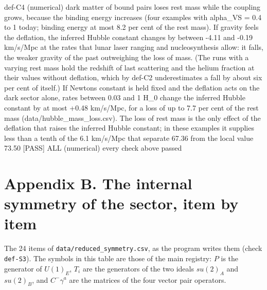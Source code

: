 \documentclass[
  10pt,
]{article}
\newenvironment{Shaded}{}{}
\newcommand{\NormalTok}[1]{#1}
\begin{document}
\begin{Shaded}
\begin{Highlighting}[]
\NormalTok{[PASS] def{-}C4  (numerical) dark matter of bound pairs loses rest mass while the coupling grows, because the binding energy increases (four examples with alpha\_VS = 0.4 to 1 today; binding energy at most 8.2 per cent of the rest mass). If gravity feels the deflation, the inferred Hubble constant changes by between {-}4.11 and {-}0.19 km/s/Mpc at the rates that lunar laser ranging and nucleosynthesis allow: it falls, the weaker gravity of the past outweighing the loss of mass. (The runs with a varying rest mass hold the redshift of last scattering and the helium fraction at their values without deflation, which by def{-}C2 underestimates a fall by about six per cent of itself.) If Newton\textquotesingle{}s constant is held fixed and the deflation acts on the dark sector alone, rates between 0.03 and 1 H\_0 change the inferred Hubble constant by at most +0.48 km/s/Mpc, for a loss of up to 7.7 per cent of the rest mass (data/hubble\_mass\_loss.csv). The loss of rest mass is the only effect of the deflation that raises the inferred Hubble constant; in these examples it supplies less than a tenth of the 6.1 km/s/Mpc that separate 67.36 from the local value 73.50}
\NormalTok{[PASS] ALL  (numerical) every check above passed}
\end{Highlighting}
\end{Shaded}

\hypertarget{appendix-b.-the-internal-symmetry-of-the-sector-item-by-item}{%
\section{Appendix B. The internal symmetry of the sector, item by
item}\label{appendix-b.-the-internal-symmetry-of-the-sector-item-by-item}}

The 24 items of \texttt{data/reduced\_symmetry.csv}, as the program
writes them (check \texttt{def-S3}). The symbols in this table are those
of the main registry: \(P\) is the generator of \(U(1)_E\), \(T_i\) are
the generators of the two ideals \(su(2)_A\) and \(su(2)_B\), and
\(C^-\gamma^a\) are the matrices of the four vector pair operators.
\end{document}
